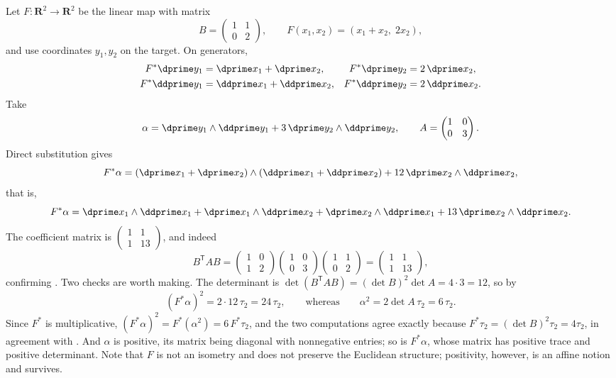 \begin{example}
\label{ex:ch09-pullback-explicit}
Let $F:\mathbf R^2\to\mathbf R^2$ be the linear map with matrix
\[
 B=\begin{pmatrix}1&1\\0&2\end{pmatrix},
 \qquad
 F(x_1,x_2)=(x_1+x_2,\;2x_2),
\]
and use coordinates $y_1,y_2$ on the target.  On generators,
\[
 \begin{aligned}
  F^*\dprime y_1&=\dprime x_1+\dprime x_2,
  &F^*\dprime y_2&=2\,\dprime x_2,\\
  F^*\ddprime y_1&=\ddprime x_1+\ddprime x_2,
  &F^*\ddprime y_2&=2\,\ddprime x_2 .
 \end{aligned}
\]
Take
\[
 \alpha=\dprime y_1\wedge\ddprime y_1
       +3\,\dprime y_2\wedge\ddprime y_2,
 \qquad
 A=\begin{pmatrix}1&0\\0&3\end{pmatrix}.
\]
Direct substitution gives
\[
 F^*\alpha
 =(\dprime x_1+\dprime x_2)\wedge(\ddprime x_1+\ddprime x_2)
  +12\,\dprime x_2\wedge\ddprime x_2,
\]
that is,
\[
 F^*\alpha
 =\dprime x_1\wedge\ddprime x_1
  +\dprime x_1\wedge\ddprime x_2
  +\dprime x_2\wedge\ddprime x_1
  +13\,\dprime x_2\wedge\ddprime x_2 .
\]
The coefficient matrix is $\left(\begin{smallmatrix}1&1\\1&13\end{smallmatrix}\right)$, and indeed
\[
 B^{\mathsf T}AB
 =\begin{pmatrix}1&0\\1&2\end{pmatrix}
  \begin{pmatrix}1&0\\0&3\end{pmatrix}
  \begin{pmatrix}1&1\\0&2\end{pmatrix}
 =\begin{pmatrix}1&1\\1&13\end{pmatrix},
\]
confirming .  Two checks are worth making.
The determinant is $\det(B^{\mathsf T}AB)=(\det B)^2\det A=4\cdot3=12$, so by
\[
 (F^*\alpha)^2=2\cdot12\,\tau_2=24\,\tau_2,
 \qquad\text{whereas}\qquad
 \alpha^2=2\det A\,\tau_2=6\,\tau_2 .
\]
Since $F^*$ is multiplicative, $(F^*\alpha)^2=F^*(\alpha^2)=6\,F^*\tau_2$,
and the two computations agree exactly because
$F^*\tau_2=(\det B)^2\tau_2=4\tau_2$, in agreement with
.  And $\alpha$ is positive, its matrix
being diagonal with nonnegative entries; so is $F^*\alpha$, whose matrix has
positive trace and positive determinant.  Note that $F$ is not an isometry
and does not preserve the Euclidean structure; positivity, however, is an
affine notion and survives.
\end{example}

